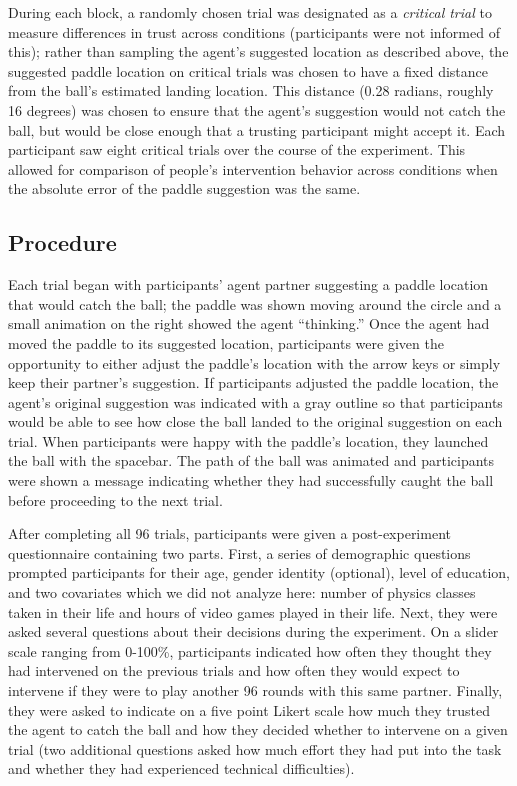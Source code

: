 \documentclass[10pt,letterpaper]{article}
\begin{document}
During each block, a randomly chosen trial was designated as a \textit{critical trial} to measure differences in trust across conditions (participants were not informed of this); rather than sampling the agent's suggested location as described above, the suggested paddle location on critical trials was chosen to have a fixed distance from the ball's estimated landing location. This distance (0.28 radians, roughly 16 degrees) was chosen to ensure that the agent's suggestion would not catch the ball, but would be close enough that a trusting participant might accept it. Each participant saw eight critical trials over the course of the experiment. This allowed for comparison of people's intervention behavior across conditions when the absolute error of the paddle suggestion was the same. 


\subsection{Procedure}
Each trial began with participants' agent partner suggesting a paddle location that would catch the ball; the paddle was shown moving around the circle and a small animation on the right showed the agent ``thinking.'' Once the agent had moved the paddle to its suggested location, participants were given the opportunity to either adjust the paddle's location with the arrow keys or simply keep their partner's suggestion. If participants adjusted the paddle location, the agent's original suggestion was indicated with a gray outline so that participants would be able to see how close the ball landed to the original suggestion on each trial. When participants were happy with the paddle's location, they launched the ball with the spacebar. The path of the ball was animated and participants were shown a message indicating whether they had successfully caught the ball before proceeding to the next trial. 

After completing all 96 trials, participants were given a post-experiment questionnaire containing two parts. First, a series of demographic questions prompted participants for their age, gender identity (optional), level of education, and two covariates which we did not analyze here: number of physics classes taken in their life and hours of video games played in their life. Next, they were asked several questions about their decisions during the experiment. On a slider scale ranging from 0-100\%, participants indicated how often they thought they had intervened on the previous trials and how often they would expect to intervene if they were to play another 96 rounds with this same partner. Finally, they were asked to indicate on a five point Likert scale how much they trusted the agent to catch the ball and how they decided whether to intervene on a given trial (two additional questions asked how much effort they had put into the task and whether they had experienced technical difficulties).
\end{document}
